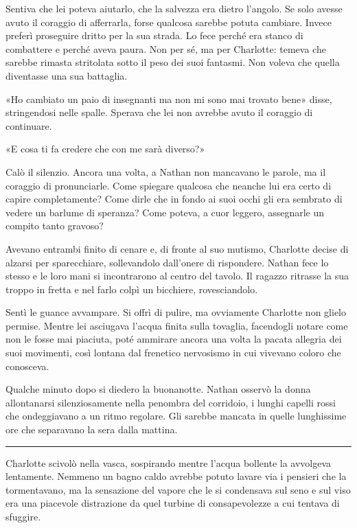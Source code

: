 \documentclass[a4paper,oneside,11pt]{memoir}
\begin{document}
Sentiva che lei poteva aiutarlo, che la salvezza era dietro l'angolo. Se solo
avesse avuto il coraggio di afferrarla, forse qualcosa sarebbe potuta cambiare.
Invece preferì proseguire dritto per la sua strada. Lo fece perché era stanco di
combattere e perché aveva paura. Non per sé, ma per Charlotte: temeva che
sarebbe rimasta stritolata sotto il peso dei suoi fantasmi. Non voleva che
quella diventasse una sua battaglia.

«Ho cambiato un paio di insegnanti ma non mi sono mai trovato bene» disse,
stringendosi nelle spalle. Sperava che lei non avrebbe avuto il coraggio di
continuare.

«E cosa ti fa credere che con me sarà diverso?»

Calò il silenzio. Ancora una volta, a Nathan non mancavano le parole, ma il
coraggio di pronunciarle. Come spiegare qualcosa che neanche lui era certo di
capire completamente? Come dirle che in fondo ai suoi occhi gli era sembrato di
vedere un barlume di speranza? Come poteva, a cuor leggero, assegnarle un
compito tanto gravoso?

Avevano entrambi finito di cenare e, di fronte al suo mutismo, Charlotte decise
di alzarsi per sparecchiare, sollevandolo dall'onere di rispondere. Nathan fece
lo stesso e le loro mani si incontrarono al centro del tavolo. Il ragazzo
ritrasse la sua troppo in fretta e nel farlo colpì un bicchiere, rovesciandolo.

Sentì le guance avvampare. Si offrì di pulire, ma ovviamente Charlotte non
glielo permise. Mentre lei asciugava l'acqua finita sulla tovaglia, facendogli
notare come non le fosse mai piaciuta, poté ammirare ancora una volta la pacata
allegria dei suoi movimenti, così lontana dal frenetico nervosismo in cui
vivevano coloro che conosceva.

Qualche minuto dopo si diedero la buonanotte. Nathan osservò la donna
allontanarsi silenziosamente nella penombra del corridoio, i lunghi capelli
rossi che ondeggiavano a un ritmo regolare. Gli sarebbe mancata in quelle
lunghissime ore che separavano la sera dalla mattina.

\plainbreak{1}

Charlotte scivolò nella vasca, sospirando mentre l'acqua bollente la avvolgeva
lentamente. Nemmeno un bagno caldo avrebbe potuto lavare via i pensieri che la
tormentavano, ma la sensazione del vapore che le si condensava sul seno e sul
viso era una piacevole distrazione da quel turbine di consapevolezze a cui
tentava di sfuggire.
\end{document}
